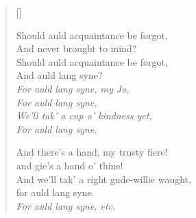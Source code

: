 \documentclass{article}
\begin{document}
\clearpage
\settowidth{\versewidth}{And we'll tak' a right gude-willie waught,}
\begin{verse}[\versewidth]
\begin{altverse}
Should auld acquaintance be forgot,\\
And never brought to mind?\\
Should auld acquaintance be forgot,\\
And auld lang syne?\\
\textit{For auld lang syne, my Jo,\\
For auld lang syne,\\
We'll tak' a cup o' kindness yet,\\
For auld lang syne.}
\end{altverse}

\begin{altverse}
And there's a hand, my trusty fiere!\\
and gie's a hand o' thine!\\
And we'll tak' a right gude-willie waught,\\
for auld lang syne.\\
\textit{For auld lang syne, etc.}
\end{altverse}
\end{verse}
\end{document}
